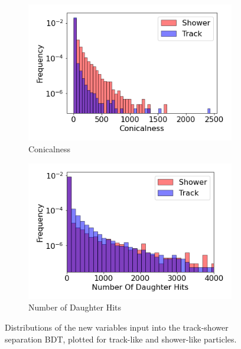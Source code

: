 \begin{figure}[htbp!]
\begin{subfigure}[b]{0.45\textwidth}
            \includegraphics[width=\textwidth]{Feature_Conicalness}
            \caption{Conicalness}%
            \label{fig:feature_conicalness}
        \end{subfigure}
        \hfill
        \begin{subfigure}[b]{0.45\textwidth}  
            \centering 
            \includegraphics[width=\textwidth]{Feature_Number_Of_Daughter_Hits}
            \caption{Number of Daughter Hits}%
            \label{fig:feature_nDaughterHits}
        \end{subfigure}
        \caption[bdt_features]{
	Distributions of the new variables input into the track-shower separation BDT, plotted for track-like and shower-like particles.
	}
        \label{fig:bdt_features}
\end{figure}

